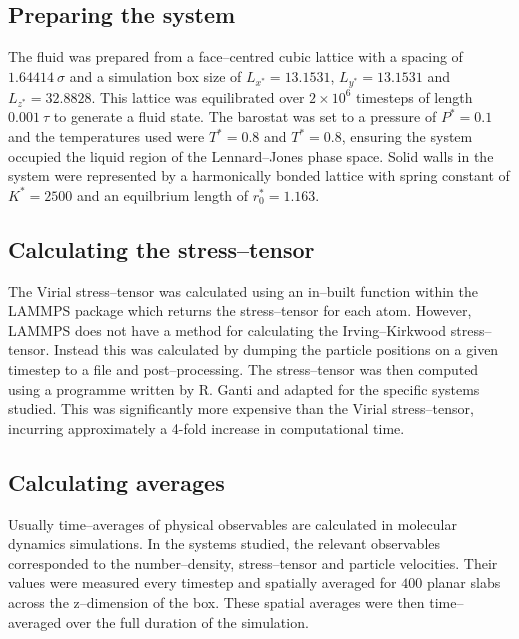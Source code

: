 \subsection{Preparing the system}
The fluid was prepared from a face--centred cubic lattice with a spacing of $1.64414\ \sigma$ and a simulation box size of $L_{x^{*}}=13.1531$, $L_{y^{*}}=13.1531$ and $L_{z^{*}}=32.8828$.
This lattice was equilibrated over $2\times 10^{6}$ timesteps of length $0.001\ \tau$ to generate a fluid state.
The barostat was set to a pressure of $P^{*} = 0.1$ and the temperatures used were $T^{*} = 0.8$ and $T^{*} = 0.8$, ensuring the system occupied the liquid region of the Lennard--Jones phase space.\cite{Smit}
Solid walls in the system were represented by a harmonically bonded lattice with spring constant of $K^{*} = 2500$ and an equilbrium length of $r^{*}_{0}=1.163$.

\subsection{Calculating the stress--tensor}\label{CalcStress}
The Virial stress--tensor was calculated using an in--built function within the LAMMPS package which returns the stress--tensor for each atom.
However, LAMMPS does not have a method for calculating the Irving--Kirkwood stress--tensor.
Instead this was calculated by dumping the particle positions on a given timestep to a file and post--processing.
The stress--tensor was then computed using a programme written by R. Ganti and adapted for the specific systems studied.
This was significantly more expensive than the Virial stress--tensor, incurring approximately a 4-fold increase in computational time.

\subsection{Calculating averages}
Usually time--averages of physical observables are calculated in molecular dynamics simulations. 
In the systems studied, the relevant observables corresponded to the number--density, stress--tensor and particle velocities.
Their values were measured every timestep and spatially averaged for $400$ planar slabs across the z--dimension of the box.
These spatial averages were then time--averaged over the full duration of the simulation.

